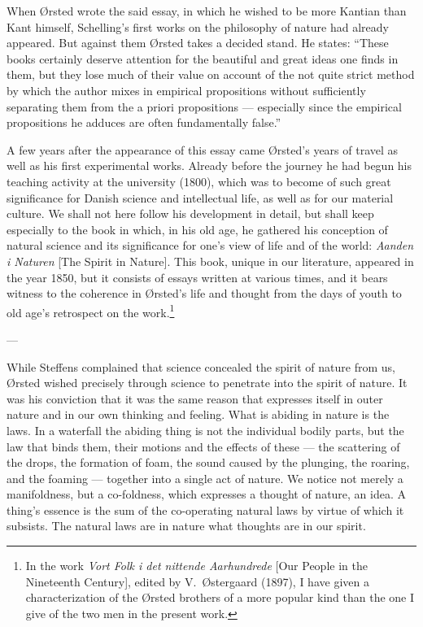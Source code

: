 \documentclass[12pt,a4paper]{book}
\newcommand{\opage}[1]{\marginnote{\footnotesize\textit{[#1]}}}
\begin{document}
When Ørsted wrote the said essay, in which he wished to be more Kantian than Kant
himself, Schelling's first works on the philosophy of nature had already appeared.
But against them Ørsted takes a decided stand. He states: ``These books certainly
deserve attention for the beautiful and great ideas one finds in them, but they lose
much of their value on account of the not quite strict method by which the author
mixes in empirical propositions without sufficiently separating them from the a
priori propositions --- especially since the empirical propositions he adduces are
often fundamentally false.''

A few years after the appearance of this essay came Ørsted's years of travel as well
as his first experimental works. Already before the journey he had begun his teaching
activity at the university (1800), which was to become of such great significance for
Danish science and intellectual life, as well as for our material culture. We shall
not here follow his development in detail, but shall keep especially to the book in
which, \opage{51}in his old age, he gathered his conception of natural science and its
significance for one's view of life and of the world: \emph{Aanden i Naturen} [The
Spirit in Nature]. This book, unique in our literature, appeared in the year 1850,
but it consists of essays written at various times, and it bears witness to the
coherence in Ørsted's life and thought from the days of youth to old age's retrospect
on the work.\footnote{In the work \emph{Vort Folk i det nittende Aarhundrede} [Our
People in the Nineteenth Century], edited by V.\ Østergaard (1897), I have given a
characterization of the Ørsted brothers of a more popular kind than the one I give of
the two men in the present work.}

\begin{center}---\end{center}

While Steffens complained that science concealed the spirit of nature from us, Ørsted
wished precisely through science to penetrate into the spirit of nature. It was his
conviction that it was the same reason that expresses itself in outer nature and in
our own thinking and feeling. What is abiding in nature is the laws. In a waterfall
the abiding thing is not the individual bodily parts, but the law that binds them,
their motions and the effects of these --- the scattering of the drops, the formation
of foam, the sound caused by the plunging, the roaring, and the foaming --- together
into a single act of nature. We notice not merely a manifoldness, but a co-foldness,
which expresses a thought of nature, an idea. A thing's essence is the sum of the
co-operating natural laws by virtue of which it subsists. The natural laws are in
nature what thoughts are in our spirit.
\end{document}
